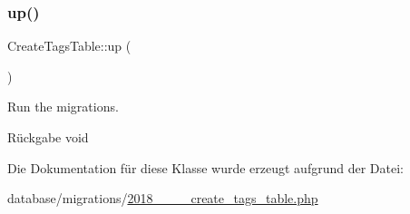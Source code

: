 \subsubsection{\texorpdfstring{up()}{up()}}
{\footnotesize\ttfamily Create\+Tags\+Table\+::up (\begin{DoxyParamCaption}{ }\end{DoxyParamCaption})}

Run the migrations.

\begin{DoxyReturn}{Rückgabe}
void 
\end{DoxyReturn}


Die Dokumentation für diese Klasse wurde erzeugt aufgrund der Datei\+:\begin{DoxyCompactItemize}
\item 
database/migrations/\hyperlink{2018__06__12__162233__create__tags__table_8php}{2018\+\_\+\_\+\_\+\_\+create\+\_\+tags\+\_\+table.\+php}\end{DoxyCompactItemize}
